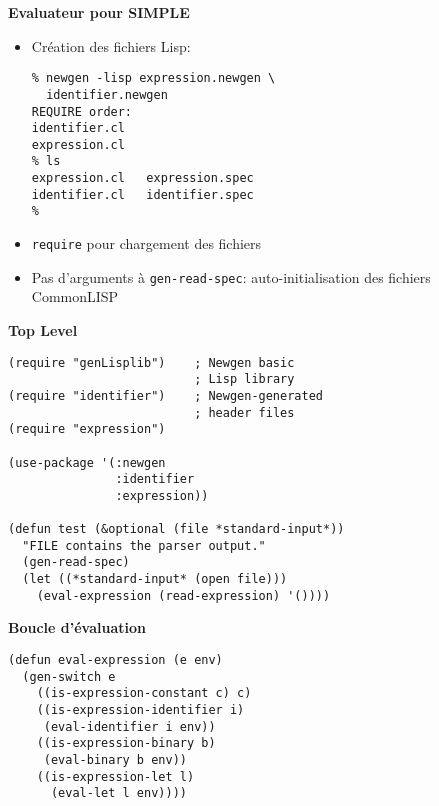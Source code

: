 \documentclass[11pt]{article}
\begin{document}
{\newpage

\begin{center}
{\huge\bf Evaluateur pour SIMPLE}
\end{center}

\vskip 2cm

\begin{itemize}
\item Création des fichiers Lisp:

\begin{verbatim}
% newgen -lisp expression.newgen \
  identifier.newgen
REQUIRE order:
identifier.cl
expression.cl
% ls
expression.cl   expression.spec   
identifier.cl   identifier.spec
%
\end{verbatim}
\item {\tt require} pour chargement des fichiers
\item Pas d'arguments à {\tt gen-read-spec}: auto-initialisation des
fichiers CommonLISP
\end{itemize}

\newpage

\begin{center}
{\huge\bf Top Level}
\end{center}

\vskip 2cm

\begin{verbatim}
(require "genLisplib")    ; Newgen basic 
                          ; Lisp library 
(require "identifier")    ; Newgen-generated 
                          ; header files 
(require "expression") 
 
(use-package '(:newgen 
               :identifier 
               :expression))

(defun test (&optional (file *standard-input*))
  "FILE contains the parser output."
  (gen-read-spec) 
  (let ((*standard-input* (open file))) 
    (eval-expression (read-expression) '())))
\end{verbatim}

\newpage

\begin{center}
{\huge\bf Boucle d'évaluation}
\end{center}

\vskip 2cm

\begin{verbatim}
(defun eval-expression (e env) 
  (gen-switch e 
    ((is-expression-constant c) c) 
    ((is-expression-identifier i) 
     (eval-identifier i env)) 
    ((is-expression-binary b) 
     (eval-binary b env))
    ((is-expression-let l) 
      (eval-let l env))))


\end{verbatim}}
\end{document}

